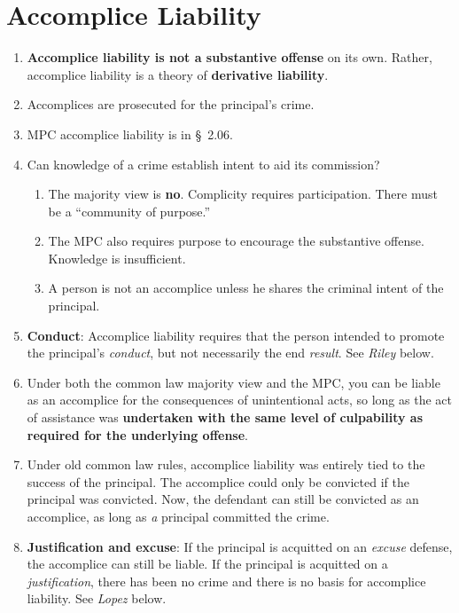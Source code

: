 \section{Accomplice Liability}

\begin{enumerate}
    \item \textbf{Accomplice liability is not a substantive offense} on its 
    own. Rather, accomplice liability is a theory of \textbf{derivative 
    liability}.
    \item Accomplices are prosecuted for the principal's crime.
    \item MPC accomplice liability is in \S\ 2.06.
    \item Can knowledge of a crime establish intent to aid its commission?
    \begin{enumerate}
        \item The majority view is \textbf{no}. Complicity requires 
        participation. There must be a ``community of purpose.''
        \item The MPC also requires purpose to encourage the substantive 
        offense. Knowledge is insufficient.
        \item A person is not an accomplice unless he shares the criminal 
        intent of the principal.
    \end{enumerate}
    \item \textbf{Conduct}: Accomplice liability requires that the person 
    intended to promote the principal's \emph{conduct}, but not necessarily 
    the end \emph{result}. See \emph{Riley} below.
    \item Under both the common law majority view and the MPC, you can be 
    liable as an accomplice for the consequences of unintentional acts, so 
    long as the act of assistance was \textbf{undertaken with the same level 
    of culpability as required for the underlying offense}.
    \item Under old common law rules, accomplice liability was entirely tied 
    to the success of the principal. The accomplice could only be convicted if 
    the principal was convicted. Now, the defendant can still be convicted as 
    an accomplice, as long as \emph{a} principal committed the crime.
    \item \textbf{Justification and excuse}: If the principal is acquitted on 
    an \emph{excuse} defense, the accomplice can still be liable. If the 
    principal is acquitted on a \emph{justification}, there has been no crime 
    and there is no basis for accomplice liability. See \emph{Lopez} below.

\end{enumerate}
